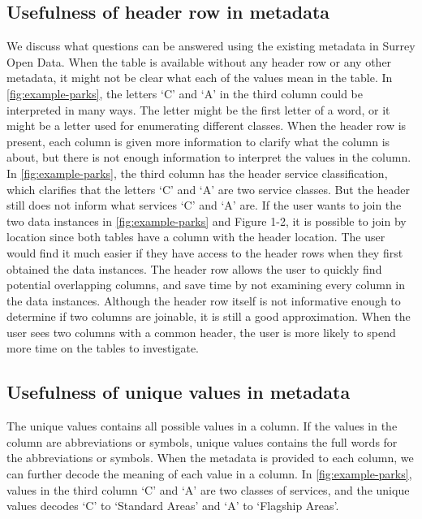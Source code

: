 \subsection{Usefulness of header row in metadata}
We discuss what questions can be answered using the existing metadata in Surrey Open Data. When the table is available without any header row or any other metadata, it might not be clear what each of the values mean in the table. In \autoref{fig:example-parks}, the letters ‘C’ and ‘A’ in the third column could be interpreted in many ways. The letter might be the first letter of a word, or it might be a letter used for enumerating different classes. When the header row is present, each column is given more information to clarify what the column is about, but there is not enough information to interpret the values in the column. In \autoref{fig:example-parks}, the third column has the header service classification, which clarifies that the letters ‘C’ and ‘A’ are two service classes. But the header still does not inform what services ‘C’ and ‘A’ are.
If the user wants to join the two data instances in \autoref{fig:example-parks} and Figure 1-2, it is possible to join by location since both tables have a column with the header location. The user would find it much easier if they have access to the header rows when they first obtained the data instances. The header row allows the user to quickly find potential overlapping columns, and save time by not examining every column in the data instances. Although the header row itself is not informative enough to determine if two columns are joinable, it is still a good approximation. When the user sees two columns with a common header, the user is more likely to spend more time on the tables to investigate.

\subsection{Usefulness of unique values in metadata}

The unique values contains all possible values in a column. If the values in the column are abbreviations or symbols, unique values contains the full words for the abbreviations or symbols.
When the metadata is provided to each column, we can further decode the meaning of each value in a column. In \autoref{fig:example-parks}, values in the third column ‘C’ and ‘A’ are two classes of services, and the unique values decodes ‘C’ to ‘Standard Areas’ and ‘A’ to ‘Flagship Areas’.

